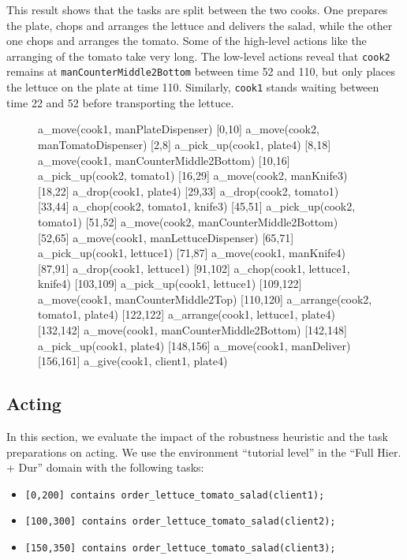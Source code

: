 This result shows that the tasks are split between the two cooks.
One prepares the plate, chops and arranges the lettuce and delivers the salad, while the other one chops and arranges the tomato.
Some of the high-level actions like the arranging of the tomato take very long.
The low-level actions reveal that \verb|cook2| remains at \verb|manCounterMiddle2Bottom| between time 52 and 110, but only places the lettuce on the plate at time 110.
Similarly, \verb|cook1| stands waiting between time 22 and 52 before transporting the lettuce.


\begin{figure}
  \begin{anmlcode}
  [0,2]     a_move(cook1, manPlateDispenser)
  [0,10]    a_move(cook2, manTomatoDispenser)
  [2,8]     a_pick_up(cook1, plate4)
  [8,18]    a_move(cook1, manCounterMiddle2Bottom)
  [10,16]   a_pick_up(cook2, tomato1)
  [16,29]   a_move(cook2, manKnife3)
  [18,22]   a_drop(cook1, plate4)
  [29,33]   a_drop(cook2, tomato1)
  [33,44]   a_chop(cook2, tomato1, knife3)
  [45,51]   a_pick_up(cook2, tomato1)
  [51,52]   a_move(cook2, manCounterMiddle2Bottom)
  [52,65]   a_move(cook1, manLettuceDispenser)
  [65,71]   a_pick_up(cook1, lettuce1)
  [71,87]   a_move(cook1, manKnife4)
  [87,91]   a_drop(cook1, lettuce1)
  [91,102]  a_chop(cook1, lettuce1, knife4)
  [103,109] a_pick_up(cook1, lettuce1)
  [109,122] a_move(cook1, manCounterMiddle2Top)
  [110,120] a_arrange(cook2, tomato1, plate4)
  [122,122] a_arrange(cook1, lettuce1, plate4)
  [132,142] a_move(cook1, manCounterMiddle2Bottom)
  [142,148] a_pick_up(cook1, plate4)
  [148,156] a_move(cook1, manDeliver)
  [156,161] a_give(cook1, client1, plate4)
  \end{anmlcode}
\end{figure}

\subsection{Acting}
\label{sec:evaluation-acting}

In this section, we evaluate the impact of the robustness heuristic and the task preparations on acting.
We use the environment ``tutorial level'' in the ``Full Hier. + Dur'' domain with the following tasks:
\begin{itemize}
  \item \verb|[0,200] contains order_lettuce_tomato_salad(client1);|
  \item \verb|[100,300] contains order_lettuce_tomato_salad(client2);|
  \item \verb|[150,350] contains order_lettuce_tomato_salad(client3);|
\end{itemize}

